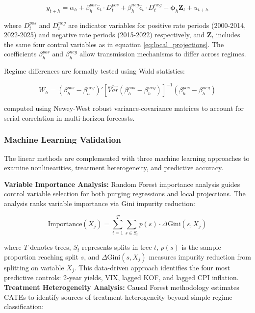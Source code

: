 \documentclass[12pt,a4paper]{article}
\begin{document}
\begin{equation}
	y_{t+h} = \alpha_h + \beta_h^{pos} \hat{\epsilon}_t \cdot D_t^{pos} + \beta_h^{neg} \hat{\epsilon}_t \cdot D_t^{neg} + \mathbf{\phi}_h \mathbf{Z}_t + u_{t+h}
	\label{eq:regime_projections}
\end{equation}

where $D_t^{pos}$ and $D_t^{neg}$ are indicator variables for positive rate periods (2000-2014, 2022-2025) and negative rate periods (2015-2022) respectively, and $\mathbf{Z}_t$ includes the same four control variables as in equation \eqref{eq:local_projections}. The coefficients $\beta_h^{pos}$ and $\beta_h^{neg}$ allow transmission mechanisms to differ across regimes.

Regime differences are formally tested using Wald statistics:

\begin{equation}
	W_h = (\beta_h^{pos} - \beta_h^{neg})' [\widehat{Var}(\beta_h^{pos} - \beta_h^{neg})]^{-1} (\beta_h^{pos} - \beta_h^{neg})
	\label{eq:wald_test}
\end{equation}

computed using Newey-West robust variance-covariance matrices to account for serial correlation in multi-horizon forecasts.

\subsubsection{Machine Learning Validation}

The linear methods are complemented with three machine learning approaches to examine nonlinearities, treatment heterogeneity, and predictive accuracy.

\textbf{Variable Importance Analysis:} Random Forest importance analysis guides control variable selection for both purging regressions and local projections. The analysis ranks variable importance via Gini impurity reduction:

\begin{equation}
	\text{Importance}(X_j) = \sum_{t=1}^{T} \sum_{s \in S_t} p(s) \cdot \Delta\text{Gini}(s, X_j)
	\label{eq:variable_importance}
\end{equation}

where $T$ denotes trees, $S_t$ represents splits in tree $t$, $p(s)$ is the sample proportion reaching split $s$, and $\Delta\text{Gini}(s, X_j)$ measures impurity reduction from splitting on variable $X_j$. This data-driven approach identifies the four most predictive controls: 2-year yields, VIX, lagged KOF, and lagged CPI inflation.
\newpage
\textbf{Treatment Heterogeneity Analysis:} Causal Forest methodology estimates CATEs to identify sources of treatment heterogeneity beyond simple regime classification:
\end{document}

